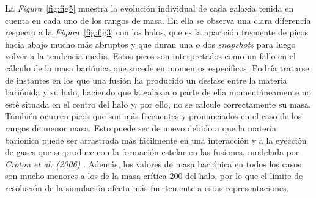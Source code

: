 La \textit{Figura}~\ref{fig:fig5} muestra la evolución individual de cada galaxia tenida en cuenta en cada uno de los rangos de masa. En ella se observa una clara diferencia respecto a la \textit{Figura}~\ref{fig:fig3} con los halos, que es la aparición frecuente de picos hacia abajo mucho más abruptos y que duran una o dos \textit{snapshots} para luego volver a la tendencia media. Estos picos son interpretados como un fallo en el cálculo de la masa bariónica que sucede en momentos específicos. Podría tratarse de instantes en los que una fusión ha producido un desfase entre la materia bariónida y su halo, haciendo que la galaxia o parte de ella momentáneamente no esté situada en el centro del halo y, por ello, no se calcule correctamente su masa. También ocurren picos que son más frecuentes y pronunciados en el caso de los rangos de menor masa. Esto puede ser de nuevo debido a que la materia barionica puede ser arrastrada más fácilmente en una interacción y a la eyección de gases que se produce con la formación estelar en las fusiones, modelada por \textit{Croton et al. (2006)} \cite{10}. Además, los valores de masa bariónica en todos los casos son mucho menores a los de la masa crítica 200 del halo, por lo que el límite de resolución de la simulación afecta más fuertemente a estas representaciones. \\

